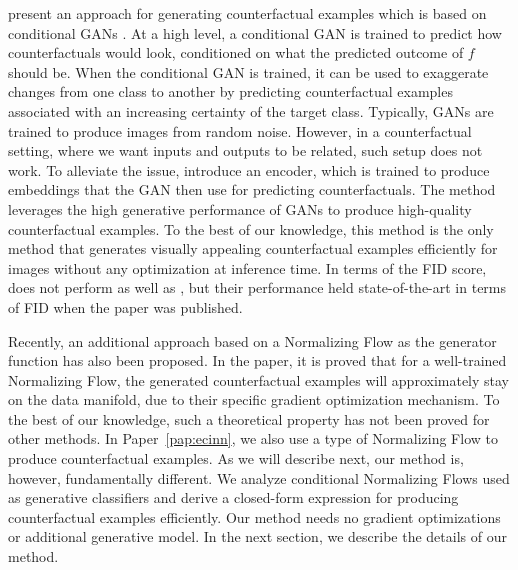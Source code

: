 \documentclass[11pt,a4paper,twoside,openright,final]{memoir}
\newcommand*{\paperref}[1]{Paper~\hyperref[#1]{\ref{#1}}}
\begin{document}
\citet{Singla2019} present an approach for generating counterfactual examples which is based on conditional GANs \cite{conditionalgan}.
At a high level, a conditional GAN is trained to predict how counterfactuals would look, conditioned on what the predicted outcome of $f$ should be. 
When the conditional GAN is trained, it can be used to exaggerate changes from one class to another by predicting counterfactual examples associated with an increasing certainty of the target class.
Typically, GANs are trained to produce images from random noise.
However, in a counterfactual setting, where we want inputs and outputs to be related, such setup does not work. 
To alleviate the issue, \citet{Singla2019} introduce an encoder, which is trained to produce embeddings that the GAN then use for predicting counterfactuals. 
The method leverages the high generative performance of GANs to produce high-quality counterfactual examples.
To the best of our knowledge, this method is the only method that generates visually appealing counterfactual examples efficiently for images without any optimization at inference time. 
In terms of the FID score, \cite{Singla2019} does not perform as well as \cite{Rodriguez2021}, but their performance held state-of-the-art in terms of FID when the paper was published.

Recently, an additional approach based on a Normalizing Flow as the generator function has also been proposed.
In the paper, it is proved that for a well-trained Normalizing Flow, the generated counterfactual examples will approximately stay on the data manifold, due to their specific gradient optimization mechanism. 
To the best of our knowledge, such a theoretical property has not been proved for other methods.
In \paperref{pap:ecinn}, we also use a type of Normalizing Flow to produce counterfactual examples. 
As we will describe next, our method is, however, fundamentally different. 
We analyze conditional Normalizing Flows used as generative classifiers and derive a closed-form expression for producing counterfactual examples efficiently. 
Our method needs no gradient optimizations or additional generative model.
In the next section, we describe the details of our method.
\end{document}
